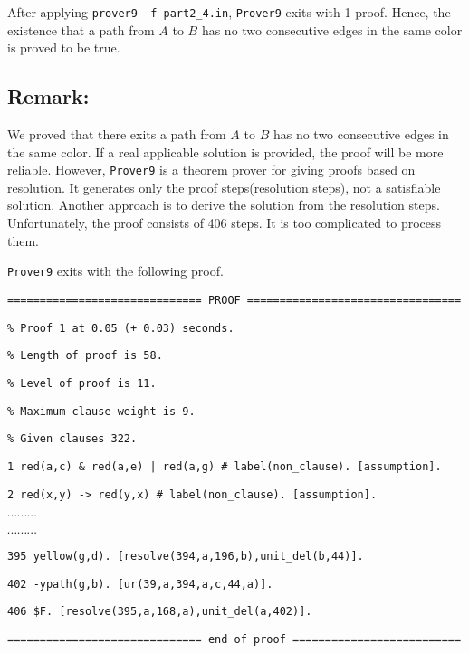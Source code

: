 \vspace{2mm}

After applying {\tt prover9 -f part2\_4.in}, {\tt Prover9} exits with 1 proof. Hence, the existence that a path from $A$ to $B$ has no two consecutive edges in the same color is proved to be true.

\subsection*{Remark:}
We proved that there exits a path from $A$ to $B$ has no two consecutive edges in the same color. If a real applicable solution is provided, the proof will be more reliable. However, {\tt Prover9} is a theorem prover for giving proofs based on resolution. It generates only the proof steps(resolution steps), not a satisfiable solution. Another approach is to derive the solution from the resolution steps. Unfortunately, the proof consists of 406 steps. It is too complicated to process them.

{\tt Prover9} exits with the following proof.

\vspace{3mm}

{\footnotesize

{\tt ============================== PROOF =================================}

{\tt \% Proof 1 at 0.05 (+ 0.03) seconds.}

{\tt \% Length of proof is 58.}

{\tt \% Level of proof is 11.}

{\tt \% Maximum clause weight is 9.}

{\tt \% Given clauses 322.}

{\tt 1 red(a,c) \& red(a,e) | red(a,g) \# label(non\_clause).  [assumption].}

{\tt 2 red(x,y) -> red(y,x) \# label(non\_clause).  [assumption].}

$\cdots \cdots \cdots$

$\cdots \cdots \cdots$

{\tt 395 yellow(g,d).  [resolve(394,a,196,b),unit\_del(b,44)].}

{\tt 402 -ypath(g,b).  [ur(39,a,394,a,c,44,a)].}

{\tt 406 \$F.  [resolve(395,a,168,a),unit\_del(a,402)].}

{\tt ============================== end of proof ==========================}

}

\vspace{2mm}

